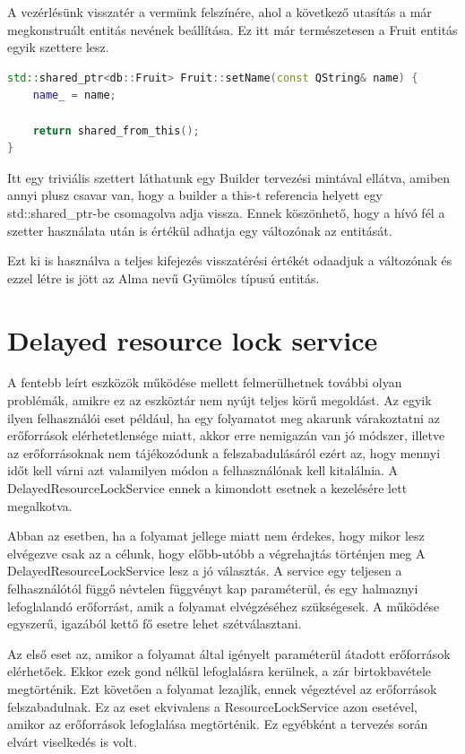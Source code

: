 A vezérlésünk visszatér a vermünk felszínére, ahol a következő utasítás a már megkonstruált entitás nevének beállítása. Ez itt már természetesen a Fruit entitás egyik szettere lesz.

\begin{lstlisting}[language={C++}]
std::shared_ptr<db::Fruit> Fruit::setName(const QString& name) {
    name_ = name;
    
    return shared_from_this();
}
\end{lstlisting}

Itt egy triviális szettert láthatunk egy Builder tervezési mintával ellátva, amiben annyi plusz csavar van, hogy a builder a this-t referencia helyett egy std::shared\_ptr-be csomagolva adja vissza. Ennek köszönhető, hogy a hívó fél a szetter használata után is értékül adhatja egy változónak az entitását.

Ezt ki is használva a teljes kifejezés visszatérési értékét odaadjuk a változónak és ezzel létre is jött az Alma nevű Gyümölcs típusú entitás.

\section{Delayed resource lock service}

A fentebb leírt eszközök működése mellett felmerülhetnek további olyan problémák, amikre ez az eszköztár nem nyújt teljes körű megoldást. Az egyik ilyen felhasználói eset például, ha egy folyamatot meg akarunk várakoztatni az erőforrások elérhetetlensége miatt, akkor erre nemigazán van jó módszer, illetve az erőforrásoknak nem tájékozódunk a felszabadulásáról ezért az, hogy mennyi időt kell várni azt valamilyen módon a felhasználónak kell kitalálnia. A DelayedResourceLockService ennek a kimondott esetnek a kezelésére lett megalkotva. 

Abban az esetben, ha a folyamat jellege miatt nem érdekes, hogy mikor lesz elvégezve csak az a célunk, hogy előbb-utóbb a végrehajtás történjen meg A DelayedResourceLockService lesz a jó választás. A service egy teljesen a felhasználótól függő névtelen függvényt kap paraméterül, és egy halmaznyi lefoglalandó erőforrást, amik a folyamat elvégzéséhez szükségesek. A működése egyszerű, igazából kettő fő esetre lehet szétválasztani.

Az első eset az, amikor a folyamat által igényelt paraméterül átadott erőforrások elérhetőek. Ekkor ezek gond nélkül lefoglalásra kerülnek, a zár birtokbavétele megtörténik. Ezt követően a folyamat lezajlik, ennek végeztével az erőforrások felszabadulnak. Ez az eset ekvivalens a ResourceLockService azon esetével, amikor az erőforrások lefoglalása megtörténik. Ez egyébként a tervezés során elvárt viselkedés is volt.

